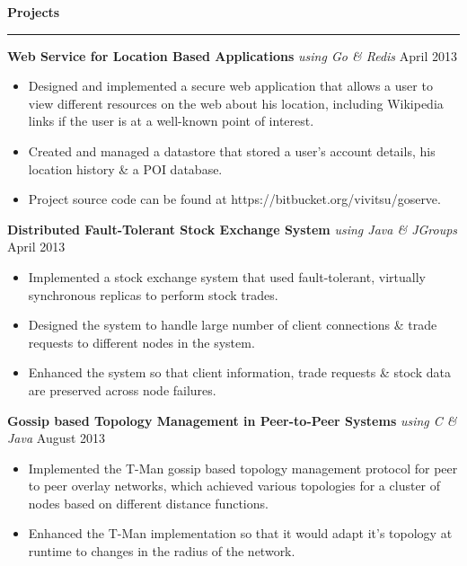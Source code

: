 \documentclass[10pt, a4paper]{article}
\begin{document}
\textbf{Projects}
\smallskip
\hrule
\textbf{Web Service for Location Based Applications} \textit{using Go \& Redis} \hfill April 2013
\begin{itemize}
    \item Designed and implemented a secure web application that allows a user to view different resources on the web about his location, including Wikipedia links if the user is at a well-known point of interest.
    \item Created and managed a datastore that stored a user's account details, his location history \& a POI database.
    \item Project source code can be found at https://bitbucket.org/vivitsu/goserve.
\end{itemize}

\textbf{Distributed Fault-Tolerant Stock Exchange System} \textit{using Java \& JGroups} \hfill April 2013
\begin{itemize}
    \item Implemented a stock exchange system that used fault-tolerant, virtually synchronous replicas to perform stock trades.
    \item Designed the system to handle large number of client connections \& trade requests to different nodes in the system.
    \item Enhanced the system so that client information, trade requests \& stock data are preserved across node failures. %
\end{itemize}
\textbf{Gossip based Topology Management in Peer-to-Peer Systems} \textit{using C \& Java} \hfill August 2013
\begin{itemize}
    \item Implemented the T-Man gossip based topology management protocol for peer to peer overlay networks, which achieved various topologies for a cluster of nodes based on different distance functions.
    \item Enhanced the T-Man implementation so that it would adapt it's topology at runtime to changes in the radius of the network. %
\end{itemize}
\end{document}

